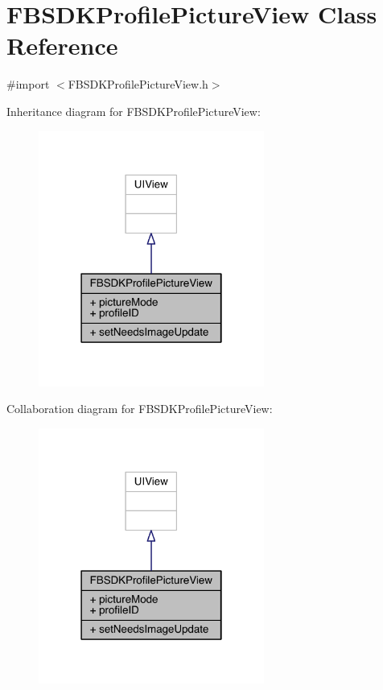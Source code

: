 \hypertarget{interface_f_b_s_d_k_profile_picture_view}{\section{F\-B\-S\-D\-K\-Profile\-Picture\-View Class Reference}
\label{interface_f_b_s_d_k_profile_picture_view}
}


{\ttfamily \#import $<$F\-B\-S\-D\-K\-Profile\-Picture\-View.\-h$>$}



Inheritance diagram for F\-B\-S\-D\-K\-Profile\-Picture\-View\-:
\nopagebreak
\begin{figure}[H]
\begin{center}
\leavevmode
\includegraphics[width=210pt]{interface_f_b_s_d_k_profile_picture_view__inherit__graph}
\end{center}
\end{figure}


Collaboration diagram for F\-B\-S\-D\-K\-Profile\-Picture\-View\-:
\nopagebreak
\begin{figure}[H]
\begin{center}
\leavevmode
\includegraphics[width=210pt]{interface_f_b_s_d_k_profile_picture_view__coll__graph}
\end{center}
\end{figure}
